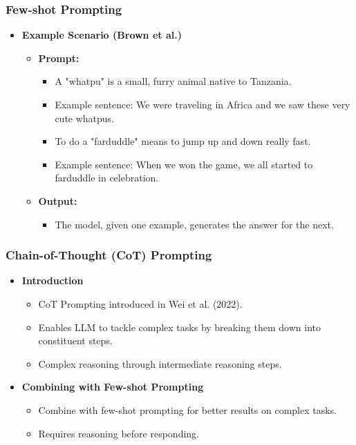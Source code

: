 \begin{frame}[fragile]\frametitle{Few-shot Prompting}

\begin{itemize}

  \item \textbf{Example Scenario (Brown et al.)}
    \begin{itemize}
      \item \textbf{Prompt:}
        \begin{itemize}
          \item A "whatpu" is a small, furry animal native to Tanzania.
          \item Example sentence: We were traveling in Africa and we saw these very cute whatpus.
          \item To do a "farduddle" means to jump up and down really fast.
          \item Example sentence: When we won the game, we all started to farduddle in celebration.
        \end{itemize}
      \item \textbf{Output:}
        \begin{itemize}
          \item The model, given one example, generates the answer for the next.
        \end{itemize}
    \end{itemize}
\end{itemize}

\end{frame}


\begin{frame}[fragile]\frametitle{Chain-of-Thought (CoT) Prompting}

\begin{itemize}
  \item \textbf{Introduction}
    \begin{itemize}
      \item CoT Prompting introduced in Wei et al. (2022).
      \item Enables LLM to tackle complex tasks by breaking them down into constituent steps.
      \item Complex reasoning through intermediate reasoning steps.
    \end{itemize}

  \item \textbf{Combining with Few-shot Prompting}
    \begin{itemize}
      \item Combine with few-shot prompting for better results on complex tasks.
      \item Requires reasoning before responding.
    \end{itemize}

\end{itemize}

\end{frame}



